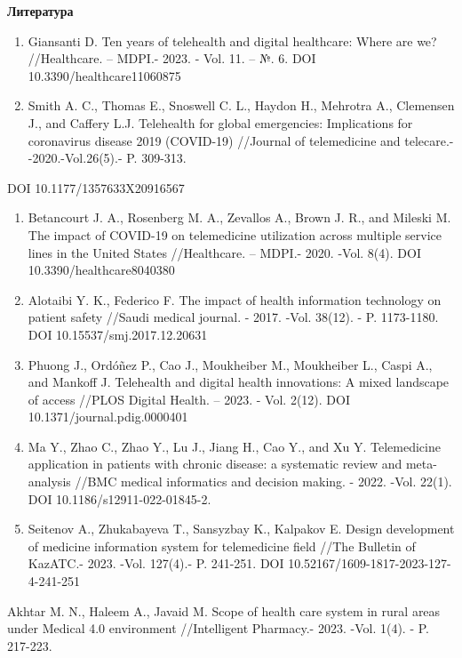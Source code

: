 {\bfseries Литература}

\begin{enumerate}
\def\labelenumi{\arabic{enumi}.}
\item
  Giansanti D. Ten years of telehealth and digital healthcare: Where are
  we? //Healthcare. -- MDPI.- 2023. - Vol. 11. -- №. 6. DOI
  10.3390/healthcare11060875
\item
  Smith A. C., Thomas E., Snoswell C. L., Haydon H., Mehrotra A.,
  Clemensen J., and Caffery L.J. Telehealth for global emergencies:
  Implications for coronavirus disease 2019 (COVID-19) //Journal of
  telemedicine and telecare.- -2020.-Vol.26(5).- P. 309-313.
\end{enumerate}

DOI 10.1177/1357633X20916567

\begin{enumerate}
\def\labelenumi{\arabic{enumi}.}
\setcounter{enumi}{2}
\item
  Betancourt J. A., Rosenberg M. A., Zevallos A., Brown J. R., and
  Mileski M. The impact of COVID-19 on telemedicine utilization across
  multiple service lines in the United States //Healthcare. -- MDPI.-
  2020. -Vol. 8(4). DOI 10.3390/healthcare8040380
\item
  Alotaibi Y. K., Federico F. The impact of health information
  technology on patient safety //Saudi medical journal. - 2017. -Vol.
  38(12). - P. 1173-1180. DOI 10.15537/smj.2017.12.20631
\item
  Phuong J., Ordóñez P., Cao J., Moukheiber M., Moukheiber L., Caspi A.,
  and Mankoff J. Telehealth and digital health innovations: A mixed
  landscape of access //PLOS Digital Health. -- 2023. - Vol. 2(12). DOI
  10.1371/journal.pdig.0000401
\item
  Ma Y., Zhao C., Zhao Y., Lu J., Jiang H., Cao Y., and Xu Y.
  Telemedicine application in patients with chronic disease: a
  systematic review and meta-analysis //BMC medical informatics and
  decision making. - 2022. -Vol. 22(1). DOI 10.1186/s12911-022-01845-2.
\item
  Seitenov A., Zhukabayeva T., Sansyzbay K., Kalpakov E. Design
  development of medicine information system for telemedicine field
  //The Bulletin of KazATC.- 2023. -Vol. 127(4).- P. 241-251. DOI
  10.52167/1609-1817-2023-127-4-241-251
\end{enumerate}

Akhtar M. N., Haleem A., Javaid M. Scope of health care system in rural
areas under Medical 4.0 environment //Intelligent Pharmacy.- 2023. -Vol.
1(4). - P. 217-223.

